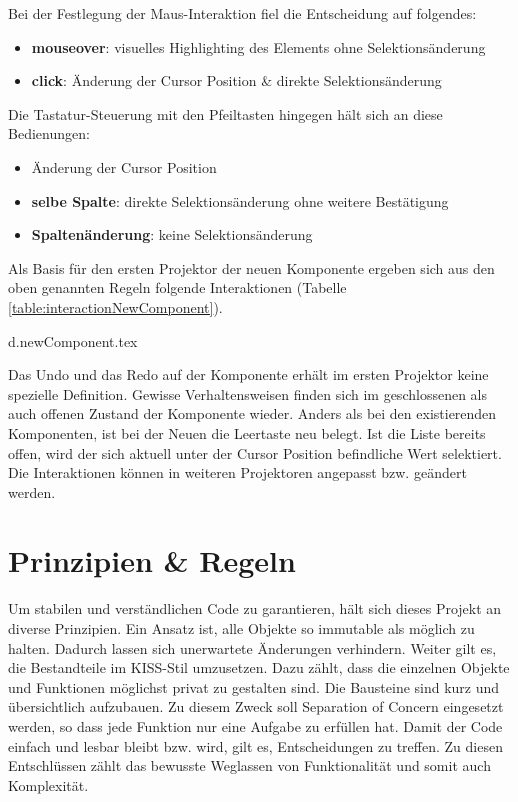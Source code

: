 \noindent
Bei der Festlegung der Maus-Interaktion fiel die Entscheidung auf folgendes:

\begin{itemize}
    \item \textbf{mouseover}: visuelles Highlighting des Elements ohne Selektionsänderung
    \item \textbf{click}: Änderung der Cursor Position \& direkte Selektionsänderung
\end{itemize}

\noindent
Die Tastatur-Steuerung mit den Pfeiltasten hingegen hält sich an diese Bedienungen:

\begin{itemize}
    \item Änderung der Cursor Position
    \item \textbf{selbe Spalte}: direkte Selektionsänderung ohne weitere Bestätigung
    \item \textbf{Spaltenänderung}: keine Selektionsänderung
\end{itemize}

\noindent
Als Basis für den ersten Projektor der neuen Komponente ergeben sich aus den oben genannten Regeln folgende Interaktionen (Tabelle \ref{table:interactionNewComponent}).

\clearpage
{d.newComponent.tex}

Das Undo und das Redo auf der Komponente erhält im ersten Projektor keine spezielle Definition.
Gewisse Verhaltensweisen finden sich im geschlossenen als auch offenen Zustand der Komponente wieder.
Anders als bei den existierenden Komponenten, ist bei der Neuen die Leertaste neu belegt. 
Ist die Liste bereits offen, wird der sich aktuell unter der Cursor Position befindliche Wert selektiert.
Die Interaktionen können in weiteren Projektoren angepasst bzw. geändert werden.


\section{Prinzipien \& Regeln}
\label{sec:principleRules}

Um stabilen und verständlichen Code zu garantieren, hält sich dieses Projekt an diverse Prinzipien.
Ein Ansatz ist, alle Objekte so immutable als möglich zu halten.
Dadurch lassen sich unerwartete Änderungen verhindern.
Weiter gilt es, die Bestandteile im KISS-Stil umzusetzen.
Dazu zählt, dass die einzelnen Objekte und Funktionen möglichst privat zu gestalten sind.
Die Bausteine sind kurz und übersichtlich aufzubauen.
Zu diesem Zweck soll Separation of Concern eingesetzt werden, so dass jede Funktion nur eine Aufgabe zu erfüllen hat.
Damit der Code einfach und lesbar bleibt bzw. wird, gilt es, Entscheidungen zu treffen.
Zu diesen Entschlüssen zählt das bewusste Weglassen von Funktionalität und somit auch Komplexität.

